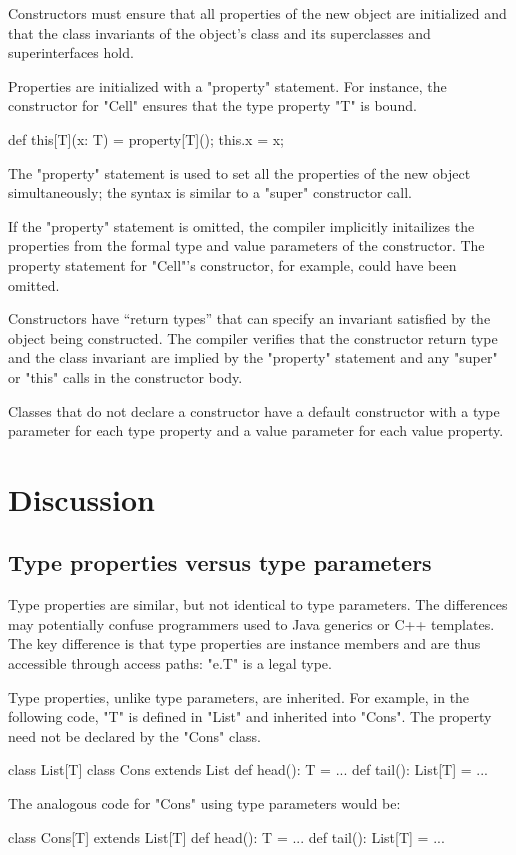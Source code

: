 \documentclass{llncs}
\begin{document}
\medskip

Constructors must ensure that all properties of the new object
are initialized and that the class invariants of the object's
class and its superclasses and superinterfaces hold.

Properties are initialized with a \xcd"property" statement.
For instance, the
constructor for \xcd"Cell" ensures that the type property \xcd"T" is bound.
\begin{xten}
    def this[T](x: T) = { property[T](); this.x = x; }
\end{xten}
The \xcd"property" statement is used to set all the properties
of the new object simultaneously; the syntax is similar to a \xcd"super"
constructor call.

If the \xcd"property" statement is omitted, the compiler implicitly
initailizes the properties from the formal type and value parameters
of the constructor.  The property statement for \xcd"Cell"'s constructor,
for example, could have been omitted.

Constructors have ``return
types'' that can specify an invariant satisfied by the object being
constructed.  The compiler verifies that the
constructor return type and the class invariant are implied by the
\xcd"property" statement and any \xcd"super"
or \xcd"this" calls in the constructor body.

Classes that do not declare a constructor 
have a default constructor with a type parameter for each
type property and a value parameter for each value property.

\section{Discussion}

\subsection{Type properties versus type parameters}

Type properties are similar, but not identical to type parameters.  The
differences may potentially confuse programmers used to Java generics or C++
templates.  The key difference is that type properties are instance members and
are thus accessible through access paths: \xcd"e.T" is a legal type.

Type properties, unlike type parameters, are inherited.
For example, in the following code, \xcd"T" is defined in \xcd"List"
and inherited into \xcd"Cons".  The property need not be
declared by the \xcd"Cons" class.
\begin{xten}
class List[T] { }
class Cons extends List {
    def head(): T = { ... }
    def tail(): List[T] = { ... }
}
\end{xten}
The analogous code for \xcd"Cons" using type parameters would be:
\begin{xten}
class Cons[T] extends List[T] {
    def head(): T = { ... }
    def tail(): List[T] = { ... }
}
\end{xten}
\end{document}
